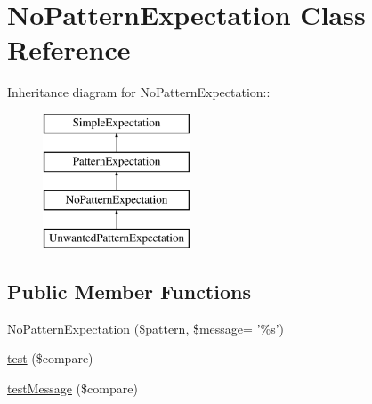 \hypertarget{class_no_pattern_expectation}{
\section{NoPatternExpectation Class Reference}
\label{class_no_pattern_expectation}
}
Inheritance diagram for NoPatternExpectation::\begin{figure}[H]
\begin{center}
\leavevmode
\includegraphics[height=4cm]{class_no_pattern_expectation}
\end{center}
\end{figure}
\subsection*{Public Member Functions}
\begin{DoxyCompactItemize}
\item 
\hyperlink{class_no_pattern_expectation_a01392fb76654440c039cc272fc752017}{NoPatternExpectation} (\$pattern, \$message= '\%s')
\item 
\hyperlink{class_no_pattern_expectation_adea22650021fb33f1d745aba552e6971}{test} (\$compare)
\item 
\hyperlink{class_no_pattern_expectation_a214eefe693fa189648ee4e51d38ed7b2}{testMessage} (\$compare)
\end{DoxyCompactItemize}


